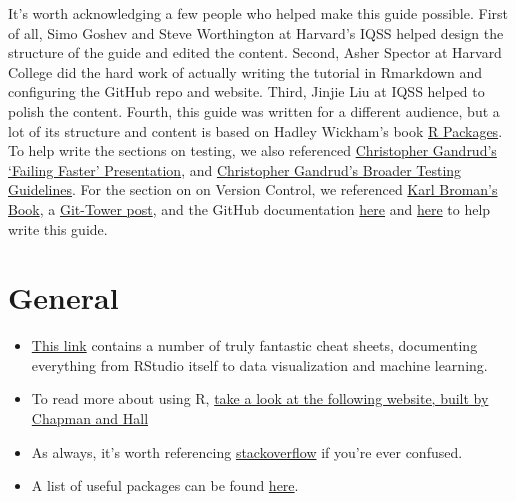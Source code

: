 \documentclass[
]{book}
\begin{document}
It's worth acknowledging a few people who helped make this guide possible. First of all, Simo Goshev and Steve Worthington at Harvard's IQSS helped design the structure of the guide and edited the content. Second, Asher Spector at Harvard College did the hard work of actually writing the tutorial in Rmarkdown and configuring the GitHub repo and website. Third, Jinjie Liu at IQSS helped to polish the content. Fourth, this guide was written for a different audience, but a lot of its structure and content is based on Hadley Wickham's book \href{http://r-pkgs.had.co.nz/}{R Packages}. To help write the sections on testing, we also referenced \href{http://slides.com/christophergandrud/failing-faster\#/24}{Christopher Gandrud's `Failing Faster' Presentation}, and \href{https://github.com/IQSS/social_science_software_toolkit/blob/master/testing/recommended_testing_tools_R.md\#recommended-testing-tools-and-process-for-r-packages}{Christopher Gandrud's Broader Testing Guidelines}. For the section on on Version Control, we referenced \href{https://kbroman.org/github_tutorial/}{Karl Broman's Book}, a \href{https://www.git-tower.com/learn/git/faq/restore-repo-to-previous-revision}{Git-Tower post}, and the GitHub documentation \href{https://git-scm.com/book/en/v2/Getting-Started-Git-Basics}{here} and \href{https://git-scm.com/book/en/v2/Getting-Started-First-Time-Git-Setup}{here} to help write this guide.

\hypertarget{general}{%
\section{General}\label{general}}

\begin{itemize}
\item
  \href{https://www.rstudio.com/resources/cheatsheets/}{This link} contains a number of truly fantastic cheat sheets, documenting everything from RStudio itself to data visualization and machine learning.
\item
  To read more about using R, \href{http://adv-r.had.co.nz/}{take a look at the following website, built by Chapman and Hall}
\item
  As always, it's worth referencing \href{https://stackoverflow.com/questions/tagged/r/}{stackoverflow} if you're ever confused.
\item
  A list of useful packages can be found \href{https://support.rstudio.com/hc/en-us/articles/201057987-Quick-list-of-useful-R-packages}{here}.
\end{itemize}
\end{document}
